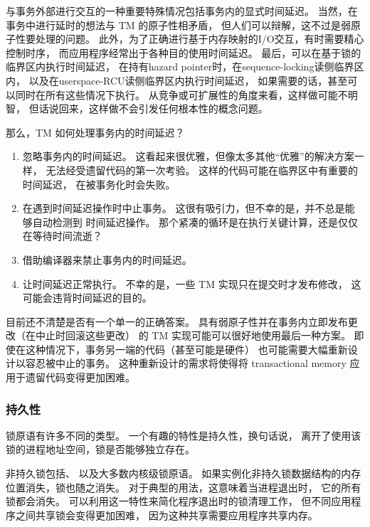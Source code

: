 与事务外部进行交互的一种重要特殊情况包括事务内的显式时间延迟。
当然，在事务中进行延时的想法与 TM 的原子性相矛盾，
但人们可以辩解，这不过是弱原子性要处理的问题。
此外，为了正确进行基于内存映射的I/O交互，有时需要精心控制时序，
而应用程序经常出于各种目的使用时间延迟。
最后，可以在基于锁的临界区内执行时间延迟，
在持有hazard pointer时，在sequence-locking读侧临界区内，
以及在userspace-RCU读侧临界区内执行时间延迟，
如果需要的话，甚至可以同时在所有这些情况下执行。
从竞争或可扩展性的角度来看，这样做可能不明智，
但话说回来，这样做不会引发任何根本性的概念问题。

那么，TM 如何处理事务内的时间延迟？

\begin{enumerate}
\item	忽略事务内的时间延迟。
	这看起来很优雅，但像太多其他``优雅''的解决方案一样，
	无法经受遗留代码的第一次考验。
	这样的代码可能在临界区中有重要的时间延迟，
	在被事务化时会失败。
\item	在遇到时间延迟操作时中止事务。
	这很有吸引力，但不幸的是，并不总是能够自动检测到
	时间延迟操作。
	那个紧凑的循环是在执行关键计算，还是仅仅在等待时间流逝？
\item	借助编译器来禁止事务内的时间延迟。
\item	让时间延迟正常执行。
	不幸的是，一些 TM 实现只在提交时才发布修改，
	这可能会违背时间延迟的目的。
\end{enumerate}

目前还不清楚是否有一个单一的正确答案。
具有弱原子性并在事务内立即发布更改（在中止时回滚这些更改）
的 TM 实现可能可以很好地使用最后一种方案。
即使在这种情况下，事务另一端的代码（甚至可能是硬件）
也可能需要大幅重新设计以容忍被中止的事务。
这种重新设计的需求将使得将 transactional memory
应用于遗留代码变得更加困难。

\subsubsection{持久性}
\label{sec:future:Persistence}

锁原语有许多不同的类型。
一个有趣的特性是持久性，换句话说，
离开了使用该锁的进程地址空间，锁是否能够独立存在。

非持久锁包括、
以及大多数内核级锁原语。
如果实例化非持久锁数据结构的内存位置消失，锁也随之消失。
对于典型的用法，这意味着当进程退出时，
它的所有锁都会消失。
可以利用这一特性来简化程序退出时的锁清理工作，
但不同应用程序之间共享锁会变得更加困难，
因为这种共享需要应用程序共享内存。

